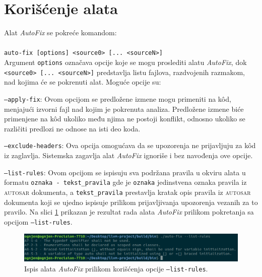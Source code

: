 \documentclass[12pt,oneside]{memoir}
\begin{document}
\section{Kori\v{s}\'{c}enje alata}

Alat \textit{AutoFix} se pokre\'{c}e komandom:
\\ \\
 \indent \indent \texttt{auto-fix [options] <source0> [... <sourceN>]} \\

\noindent Argument \texttt{options} ozna\v{c}ava opcije koje se mogu proslediti alatu \textit{AutoFix},
dok \texttt{<source0> [... <sourceN>]} predstavlja listu fajlova, razdvojenih razmakom, nad kojima će se pokrenuti alat. 
Mogu\'{c}e opcije su:
  \begin{description}
    \item \texttt{--apply-fix}: Ovom opcijom se predlo\v{z}ene izmene mogu primeniti na k\^{o}d, menjaju\'{c}i izvorni fajl nad kojim je pokrenuta analiza.
    Predlo\v{z}ene izmene bi\'{c}e primenjene na k\^{o}d ukoliko među njima ne postoji konflikt, odnosno ukoliko se razli\v{c}iti predlozi ne odnose na isti deo koda.
    \item \texttt{--exclude-headers}: Ova opcija omogu\'{c}ava da se upozorenja ne prijavljuju za k\^{o}d iz zaglavlja. Sistemska zagavlja alat
    \textit{AutoFix} ignori\v{s}e i bez navođenja ove opcije.
    \item \texttt{--list-rules}: Ovom opcijom se ispisuju sva podr\v{z}ana pravila u okviru alata u formatu \texttt{oznaka - tekst\_pravila} gde je \texttt{oznaka} jedinstvena oznaka pravila iz \textsc{autosar} dokumenta, a \texttt{tekst\_pravila} prestavlja kratak opis pravila iz \textsc{autosar} dokumenta koji se ujedno ispisuje prilikom prijavljivanja upozorenja vezanih za to pravilo. Na slici \ref{fig:listRules} prikazan je rezultat rada alata \textit{AutoFix} prilikom pokretanja sa opcijom \texttt{--list-rules}.

    \begin{figure}[!h]
    \begin{center}
    \includegraphics[scale=0.4]{listRules.png}
    \end{center}
    \caption{Ispis alata \textit{AutoFix} prilikom kori\v{s}\'{c}enja opcije \texttt{--list-rules}.}
    \label{fig:listRules}
    \end{figure}


\end{description}
\end{document}
